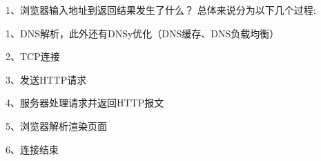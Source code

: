 1、浏览器输入地址到返回结果发生了什么？
总体来说分为以下几个过程:

1、DNS解析，此外还有DNSy优化（DNS缓存、DNS负载均衡）

2、TCP连接

3、发送HTTP请求

4、服务器处理请求并返回HTTP报文

5、浏览器解析渲染页面

6、连接结束